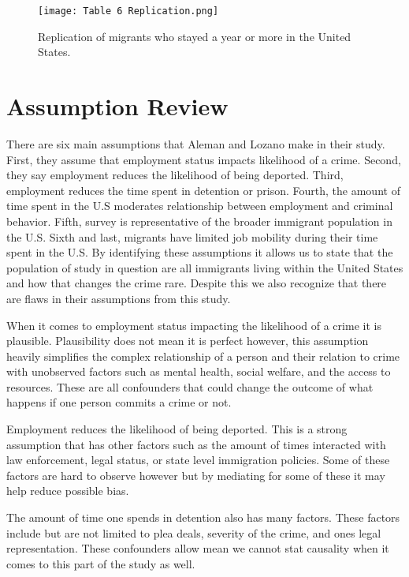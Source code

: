 \documentclass[12pt,letterpaper]{article}
\begin{document}
\begin{figure}[ht]
    \centering
    \texttt{[image: Table 6 Replication.png]}
    \caption{Replication of migrants who stayed a year or more in the United States.\citep{O_G} }
    \label{fig:Table 6 Replication}
\end{figure}

\section{Assumption Review}

    \indent There are six main assumptions that Aleman and Lozano make in their study. First, they assume that employment status impacts likelihood of a crime. Second, they say employment reduces the likelihood of being deported. Third, employment reduces the time spent in detention or prison. Fourth, the amount of time spent in the U.S moderates relationship between employment and criminal behavior. Fifth, survey is representative of the broader immigrant population in the U.S. Sixth and last, migrants have limited job mobility during their time spent in the U.S. By identifying these assumptions it allows us to state that the population of study in question are all immigrants living within the United States and how that changes the crime rare. Despite this we also recognize that there are flaws in their assumptions from this study.    

    \indent When it comes to employment status impacting the likelihood of a crime it is plausible. Plausibility does not mean it is perfect however, this assumption heavily simplifies the complex relationship of a person and their relation to crime with unobserved factors such as mental health, social welfare, and the access to resources. These are all confounders that could change the outcome of what happens if one person commits a crime or not.

    \indent Employment reduces the likelihood of being deported. This is a strong assumption that has other factors such as the amount of times interacted with law enforcement, legal status, or state level immigration policies. Some of these factors are hard to observe however but by mediating for some of these it may help reduce possible bias.

    \indent The amount of time one spends in detention also has many factors. These factors include but are not limited to plea deals, severity of the crime, and ones legal representation. These confounders allow mean we cannot stat causality when it comes to this part of the study as well.
\end{document}
